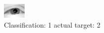 \begin{figure}[h!]
\begin{center}
\includegraphics[width=0.60\columnwidth]{figures/ID2231_class_1_target_2.png}
\end{center}
\caption{ Classification: 1 actual target: 2}
\label{fig:ID2231_class_1_target_2}
\end{figure}
